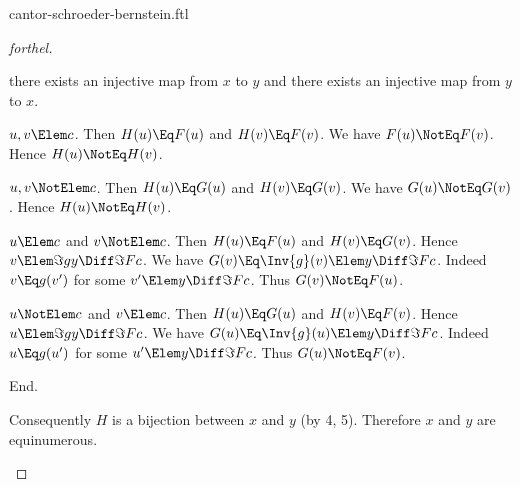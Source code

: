 \documentclass{stex}
\begin{document}
\begin{smodule}{cantor-schroeder-bernstein.ftl}
\begin{proof}[forthel]
\begin{case}{there exists an injective map from $x$ to $y$ and there exists an injective map from $y$ to $x$.}
      \begin{case}{$u,v \Elem c$.}
        Then $H(u) \Eq F(u)$ and $H(v) \Eq F(v)$.
        We have $F(u) \NotEq\linebreak F(v)$.
        Hence $H(u) \NotEq H(v)$.
      \end{case}

      \begin{case}{$u,v \NotElem c$.}
        Then $H(u) \Eq G(u)$ and $H(v) \Eq G(v)$.
        We have $G(u) \NotEq\linebreak G(v)$.
        Hence $H(u) \NotEq H(v)$.
      \end{case}

      \begin{case}{$u \Elem c$ and $v \NotElem c$.}
        Then $H(u) \Eq F(u)$ and $H(v) \Eq G(v)$.
        Hence $v \Elem \Im{g}{y \Diff \Im{F}{c}}$.
        We have $G(v) \Eq \Inv{g}(v) \Elem y \Diff \Im{F}{c}$.
        Indeed $v \Eq g(v')$ for some $v' \Elem y \Diff \Im{F}{c}$.
        Thus $G(v) \NotEq F(u)$.
      \end{case}

      \begin{case}{$u \NotElem c$ and $v \Elem c$.}
        Then $H(u) \Eq G(u)$ and $H(v) \Eq F(v)$.
        Hence $u \Elem \Im{g}{y \Diff \Im{F}{c}}$.
        We have $G(u) \Eq \Inv{g}(u) \Elem y \Diff \Im{F}{c}$.
        Indeed $u \Eq g(u')$ for some $u' \Elem y \Diff \Im{F}{c}$.
        Thus $G(u) \NotEq F(v)$.
      \end{case}
    End.

    Consequently $H$ is a bijection between $x$ and $y$ (by 4, 5).
    Therefore $x$ and $y$ are equinumerous.
  \end{case}
\end{proof}

\printbibliography
{}

\end{smodule}
\end{document}
